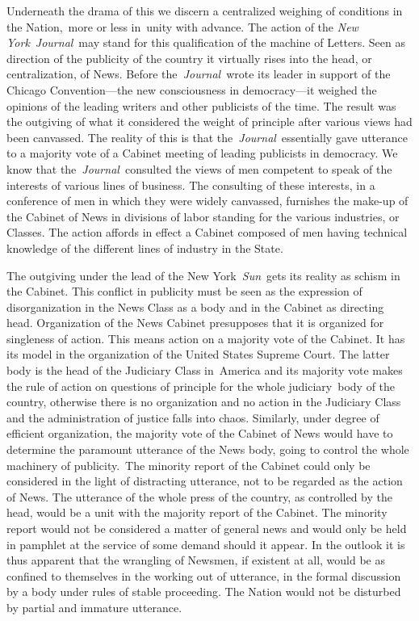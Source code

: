 \documentclass[openany,nobib]{tufte-book}
\begin{document}
Underneath the drama of this we discern a centralized weighing of
conditions in the Nation,~more or less in~unity with advance. The action
of the \emph{New York}~\emph{Journal}~may stand for this qualification
of the machine of Letters. Seen as direction of the publicity of the
country it virtually rises into the head, or centralization, of News.
Before the\emph{~Journal}~wrote its leader in support of the Chicago
Convention---the new consciousness in democracy---it weighed the
opinions of the leading writers and other publicists of the time. The
result was the outgiving of what it considered the weight of principle
after various views had been canvassed. The reality of this is that
the~\emph{Journal}~essentially gave utterance to a majority vote of a
Cabinet meeting of leading publicists in democracy. We know that
the~\emph{Journal~}consulted the views of men competent to speak of the
interests of various lines of business. The consulting of these
interests, in a conference of men in which they were widely canvassed,
furnishes the make-up of the Cabinet of News in divisions of labor
standing for the various industries, or Classes. The action affords in
effect a Cabinet composed of men having technical knowledge of the
different lines of industry in the State.~

The outgiving under the lead of the New York~\emph{Sun}~gets its reality
as schism in the Cabinet. This conflict in publicity must be seen as the
expression of disorganization in the News Class as a body and in the
Cabinet as directing head. Organization of the News Cabinet presupposes
that it is organized for singleness of action. This means action on a
majority vote of the Cabinet. It has its model in the organization of
the United States Supreme Court. The latter body is the head of the
Judiciary Class in~America and its majority vote makes the rule of
action on questions of principle for the whole judiciary~body of the
country, otherwise there is no organization and no action in the
Judiciary Class and the administration of justice falls into chaos.
Similarly, under degree of efficient organization, the majority vote of
the Cabinet of News would have to determine the paramount utterance of
the News body, going to control the whole machinery of publicity.~The
minority report of the Cabinet could only be considered in the light of
distracting utterance, not to be regarded as the action of News. The
utterance of the whole press of the country, as controlled by the head,
would be a unit with the majority report of the Cabinet. The minority
report would not be considered a matter of general news and would only
be held in pamphlet at the service of some demand should it appear. In
the outlook it is thus apparent that the wrangling of Newsmen, if
existent at all, would be as confined to themselves in the working out
of utterance, in the formal discussion by a body under rules of stable
proceeding. The Nation would not be disturbed by partial and immature
utterance.~
\end{document}
